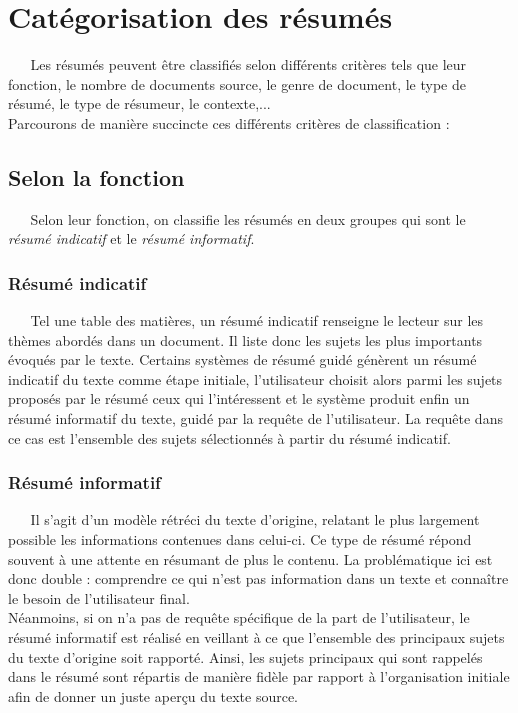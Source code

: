 \section{Catégorisation des résumés}
$ _{} $ $ _{} $ $ _{} $ $ _{} $ $ _{} $Les résumés peuvent être classifiés selon différents critères tels que leur fonction, le nombre de documents source, le genre de document, le type de résumé, le type de résumeur, le contexte,...\\
Parcourons de manière succincte ces différents critères de classification \cite{MaaliMnasri,maaloul:tel-00756111,mani2001automatic,Nenkova,moens2001automatic,torres2014automatic}
:
\subsection{Selon la fonction}
$ _{} $ $ _{} $ $ _{} $ $ _{} $ $ _{} $Selon leur fonction, on classifie les résumés en deux groupes qui sont le \textit{résumé indicatif} et le \textit{résumé informatif}.
\subsubsection{Résumé indicatif}
$ _{} $ $ _{} $ $ _{} $ $ _{} $ $ _{} $Tel une table des matières, un résumé indicatif renseigne le lecteur sur les thèmes abordés dans un document. Il liste donc les sujets les plus importants évoqués par le texte. Certains systèmes de résumé guidé génèrent un résumé indicatif du texte comme étape initiale, l'utilisateur choisit alors parmi les sujets proposés par le résumé ceux qui l'intéressent et le système produit enfin un résumé informatif du texte, guidé par la requête de l'utilisateur. La requête dans ce cas est l'ensemble des sujets sélectionnés à partir du résumé indicatif.
\subsubsection{Résumé informatif}
$ _{} $ $ _{} $ $ _{} $ $ _{} $ $ _{} $Il s'agit d'un modèle rétréci du texte d'origine, relatant le plus largement possible les informations contenues dans celui-ci. Ce type de résumé répond souvent à une attente en résumant de plus le contenu. La problématique ici est donc double : comprendre ce qui n'est pas information dans un texte et connaître le besoin de l'utilisateur final.\\
Néanmoins, si on n'a pas de requête spécifique de la part de l'utilisateur, le résumé informatif est réalisé en veillant à ce que l'ensemble des principaux sujets du texte d'origine soit rapporté. Ainsi, les sujets principaux qui sont rappelés dans le résumé sont répartis de manière fidèle par rapport à l'organisation initiale afin de donner un juste aperçu du texte source.\newpage
